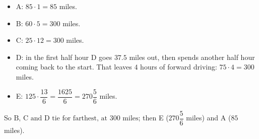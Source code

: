 \begin{itemize}
\item A: $85\cdot1=85$ miles.
\item B: $60\cdot5=300$ miles.
\item C: $25\cdot12=300$ miles.
\item D: in the first half hour D goes $37.5$ miles out, then spends another half hour coming back to the start. That leaves $4$ hours of forward driving: $75\cdot4=300$ miles.
\item E: $125\cdot\dfrac{13}{6}=\dfrac{1625}{6}=270\dfrac{5}{6}$ miles.
\end{itemize}
So $\boxed{\text{B, C and D tie for farthest, at }300\text{ miles}}$; then E ($270\dfrac{5}{6}$ miles) and A ($85$ miles).
